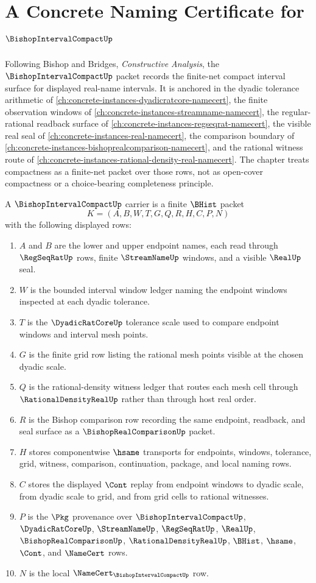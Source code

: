 \chapter{A Concrete Naming Certificate for $\BishopIntervalCompactUp$}
\label{ch:concrete-instances-bishop-interval-compact-namecert}

Following Bishop and Bridges, \emph{Constructive Analysis}, the $\BishopIntervalCompactUp$ packet records the finite-net compact interval surface for displayed real-name intervals. It is anchored in the dyadic tolerance arithmetic of \autoref{ch:concrete-instances-dyadicratcore-namecert}, the finite observation windows of \autoref{ch:concrete-instances-streamname-namecert}, the regular-rational readback surface of \autoref{ch:concrete-instances-regseqrat-namecert}, the visible real seal of \autoref{ch:concrete-instances-real-namecert}, the comparison boundary of \autoref{ch:concrete-instances-bishoprealcomparison-namecert}, and the rational witness route of \autoref{ch:concrete-instances-rational-density-real-namecert}. The chapter treats compactness as a finite-net packet over those rows, not as open-cover compactness or a choice-bearing completeness principle.

A $\BishopIntervalCompactUp$ carrier is a finite $\BHist$ packet
$$
K=(A,B,W,T,G,Q,R,H,C,P,N)
$$
with the following displayed rows:
\begin{enumerate}
\item $A$ and $B$ are the lower and upper endpoint names, each read through $\RegSeqRatUp$ rows, finite $\StreamNameUp$ windows, and a visible $\RealUp$ seal.
\item $W$ is the bounded interval window ledger naming the endpoint windows inspected at each dyadic tolerance.
\item $T$ is the $\DyadicRatCoreUp$ tolerance scale used to compare endpoint windows and interval mesh points.
\item $G$ is the finite grid row listing the rational mesh points visible at the chosen dyadic scale.
\item $Q$ is the rational-density witness ledger that routes each mesh cell through $\RationalDensityRealUp$ rather than through host real order.
\item $R$ is the Bishop comparison row recording the same endpoint, readback, and seal surface as a $\BishopRealComparisonUp$ packet.
\item $H$ stores componentwise $\hsame$ transports for endpoints, windows, tolerance, grid, witness, comparison, continuation, package, and local naming rows.
\item $C$ stores the displayed $\Cont$ replay from endpoint windows to dyadic scale, from dyadic scale to grid, and from grid cells to rational witnesses.
\item $P$ is the $\Pkg$ provenance over $\BishopIntervalCompactUp$, $\DyadicRatCoreUp$, $\StreamNameUp$, $\RegSeqRatUp$, $\RealUp$, $\BishopRealComparisonUp$, $\RationalDensityRealUp$, $\BHist$, $\hsame$, $\Cont$, and $\NameCert$ rows.
\item $N$ is the local $\NameCert_{\BishopIntervalCompactUp}$ row.
\end{enumerate}

